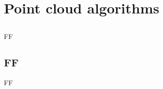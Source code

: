 \chapter{Point cloud algorithms}\label{chap:point-cloud-algorithms}



\section*{}

FF



\section{FF}

FF
